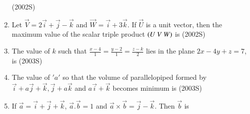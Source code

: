 \documentclass[journal,12pt,twocolumn]{IEEEtran}
\theoremstyle{remark}
\begin{document}
\begin{enumerate}
\hfill (2002S)
\begin{enumerate}
\end{enumerate}
\item Let $\vec{V}= 2\vec{i}+\vec{j}-\vec{k}$ and $\vec{W}= \vec{i}+3\vec{k}$. If $\vec{U}$ is a unit vector, then the maximum value of the scalar triple product $\left(U \ V \ W\right)$ is 
\hfill (2002S)
\begin{enumerate}
\end{enumerate}
\item The value of $k$ such that $\frac{x-4}{1}=\frac{y-2}{1}=\frac{z-k}{2}$ lies in the plane $2x-4y+z=7$, is
\hfill (2003S)
\begin{enumerate}
\end{enumerate}
\item The value of $'a'$ so that the volume of parallelopiped formed by $\vec{i}+a\vec{j}+\vec{k},\vec{j}+a\vec{k}$ and $a\vec{i}+\vec{k}$ becomes minimum is 
\hfill (2003S)
\begin{enumerate}
\end{enumerate}
\item If $\vec{a}=\vec{i}+\vec{j}+\vec{k}$, $\vec{a}.\vec{b}=1$ and $\vec{a} \times \vec{b} = \vec{j} - \vec{k}$. Then $\vec{b}$ is 

\end{enumerate}
\end{document}
